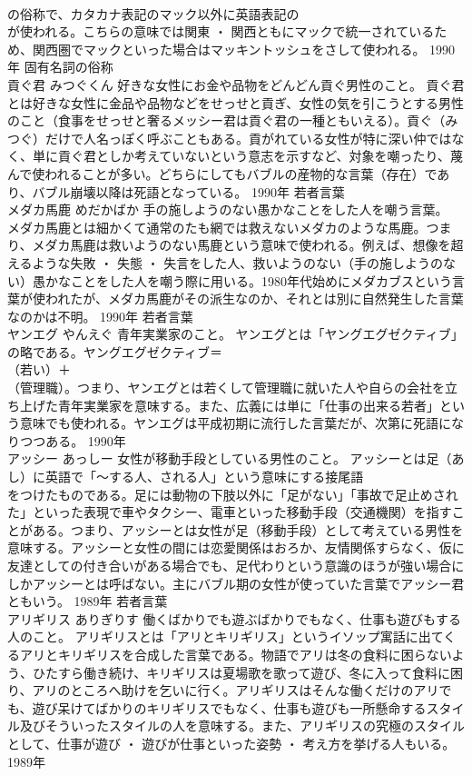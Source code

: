 \documentclass[8pt]{extreport}
\begin{document}
\begin{CJK}{UTF8}{min}
\\	の俗称で、カタカナ表記のマック以外に英語表記の
\\	が使われる。こちらの意味では関東 ・ 関西ともにマックで統一されているため、関西圏でマックといった場合はマッキントッシュをさして使われる。	1990年	固有名詞の俗称	
\\	貢ぐ君	みつぐくん	好きな女性にお金や品物をどんどん貢ぐ男性のこと。	貢ぐ君とは好きな女性に金品や品物などをせっせと貢ぎ、女性の気を引こうとする男性のこと（食事をせっせと奢るメッシー君は貢ぐ君の一種ともいえる）。貢ぐ（みつぐ）だけで人名っぽく呼ぶこともある。貢がれている女性が特に深い仲ではなく、単に貢ぐ君としか考えていないという意志を示すなど、対象を嘲ったり、蔑んで使われることが多い。どちらにしてもバブルの産物的な言葉（存在）であり、バブル崩壊以降は死語となっている。	1990年	若者言葉	
\\	メダカ馬鹿	めだかばか	手の施しようのない愚かなことをした人を嘲う言葉。	メダカ馬鹿とは細かくて通常のたも網では救えないメダカのような馬鹿。つまり、メダカ馬鹿は救いようのない馬鹿という意味で使われる。例えば、想像を超えるような失敗 ・ 失態 ・ 失言をした人、救いようのない（手の施しようのない）愚かなことをした人を嘲う際に用いる。1980年代始めにメダカブスという言葉が使われたが、メダカ馬鹿がその派生なのか、それとは別に自然発生した言葉なのかは不明。	1990年	若者言葉	
\\	ヤンエグ	やんえぐ	青年実業家のこと。	ヤンエグとは「ヤングエグゼクティブ」の略である。ヤングエグゼクティブ＝
\\	（若い）＋
\\	（管理職）。つまり、ヤンエグとは若くして管理職に就いた人や自らの会社を立ち上げた青年実業家を意味する。また、広義には単に「仕事の出来る若者」という意味でも使われる。ヤンエグは平成初期に流行した言葉だが、次第に死語になりつつある。	1990年	
\\	アッシー	あっしー	女性が移動手段としている男性のこと。	アッシーとは足（あし）に英語で「～する人、される人」という意味にする接尾語
\\	をつけたものである。足には動物の下肢以外に「足がない」「事故で足止めされた」といった表現で車やタクシー、電車といった移動手段（交通機関）を指すことがある。つまり、アッシーとは女性が足（移動手段）として考えている男性を意味する。アッシーと女性の間には恋愛関係はおろか、友情関係すらなく、仮に友達としての付き合いがある場合でも、足代わりという意識のほうが強い場合にしかアッシーとは呼ばない。主にバブル期の女性が使っていた言葉でアッシー君ともいう。	1989年	若者言葉	
\\	アリギリス	ありぎりす	働くばかりでも遊ぶばかりでもなく、仕事も遊びもする人のこと。	アリギリスとは「アリとキリギリス」というイソップ寓話に出てくるアリとキリギリスを合成した言葉である。物語でアリは冬の食料に困らないよう、ひたすら働き続け、キリギリスは夏場歌を歌って遊び、冬に入って食料に困り、アリのところへ助けを乞いに行く。アリギリスはそんな働くだけのアリでも、遊び呆けてばかりのキリギリスでもなく、仕事も遊びも一所懸命するスタイル及びそういったスタイルの人を意味する。また、アリギリスの究極のスタイルとして、仕事が遊び ・ 遊びが仕事といった姿勢 ・ 考え方を挙げる人もいる。	1989年	

\end{CJK}
\end{document}
